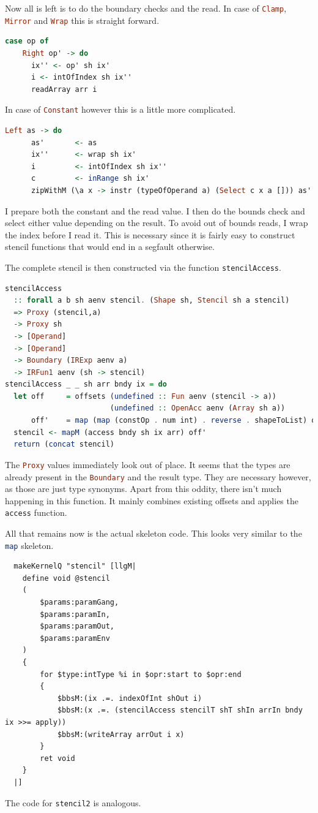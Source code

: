 \documentclass[a4paper,bibliography=totocnumbered,parskip,headsepline]{scrbook}
\begin{document}
Now all is left is to do the boundary checks and the read.
In case of \lstinline[language=haskell]!Clamp!, \lstinline[language=haskell]!Mirror! and \lstinline[language=haskell]!Wrap! this is straight forward.
\begin{lstlisting}[language=haskell]
  case op of
    Right op' -> do
      ix'' <- op' sh ix'
      i <- intOfIndex sh ix''
      readArray arr i
\end{lstlisting}
In case of \lstinline[language=haskell]!Constant! however this is a little more complicated.
\begin{lstlisting}[language=haskell]
    Left as -> do
      as'       <- as
      ix''      <- wrap sh ix'
      i         <- intOfIndex sh ix''
      c         <- inRange sh ix'
      zipWithM (\a x -> instr (typeOfOperand a) (Select c x a [])) as' xs
\end{lstlisting}
I prepare both the constant and the read value.
I then do the bounds check and select either value depending on the result.
To avoid out of bounds reads, I wrap the index before I read it.
This is necessary since it is fairly easy to construct stencil functions that would end in a segfault otherwise.

The complete stencil is then constructed via the function \lstinline[language=haskell]!stencilAccess!.
\begin{lstlisting}[language=haskell]
stencilAccess
  :: forall a b sh aenv stencil. (Shape sh, Stencil sh a stencil)
  => Proxy (stencil,a)
  -> Proxy sh
  -> [Operand]
  -> [Operand]
  -> Boundary (IRExp aenv a)
  -> IRFun1 aenv (sh -> stencil)
stencilAccess _ _ sh arr bndy ix = do
  let off     = offsets (undefined :: Fun aenv (stencil -> a))
                        (undefined :: OpenAcc aenv (Array sh a))
      off'    = map (map (constOp . num int) . reverse . shapeToList) off
  stencil <- mapM (access bndy sh ix arr) off'
  return (concat stencil)
\end{lstlisting}
The \lstinline[language=haskell]!Proxy! values immediately look out of place.
It seems that the types are already present in the \lstinline[language=haskell]!Boundary! and the result type.
They are necessary however, as those are just type synonyms.
Apart from this oddity, there isn't much happening in this function.
It mainly combines existing offsets and applies the \lstinline[language=haskell]!access! function.

All that remains now is the actual skeleton code.
This looks very similar to the \lstinline[language=haskell]!map! skeleton.
\begin{lstlisting}
  makeKernelQ "stencil" [llgM|
    define void @stencil
    (
        $params:paramGang,
        $params:paramIn,
        $params:paramOut,
        $params:paramEnv
    )
    {
        for $type:intType %i in $opr:start to $opr:end
        {
            $bbsM:(ix .=. indexOfInt shOut i)
            $bbsM:(x .=. (stencilAccess stencilT shT shIn arrIn bndy ix >>= apply))
            $bbsM:(writeArray arrOut i x)
        }
        ret void
    }
  |]
\end{lstlisting}
The code for \lstinline[language=haskell]!stencil2! is analogous.
\end{document}
